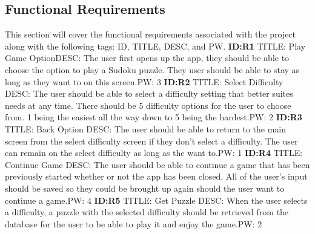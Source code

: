 \documentclass{article}
\begin{document}
\subsection{Functional Requirements}
This section will cover the functional requirements associated with the project along with the following tags: ID, TITLE, DESC, and PW. \newline \newline
\textbf{ID:R1} \newline TITLE: Play Game Option\newline DESC: The user first opens up the app, they should be able to choose the option to play a Sudoku puzzle. They user should be able to stay as long as they want to on this screen.\newline PW: 3 \newline \newline
\textbf{ID:R2} \newline TITLE: Select Difficulty \newline DESC: The user should be able to select a difficulty setting that better suites needs at any time. There should be 5 difficulty options for the user to choose from. 1 being the easiest all the way down to 5 being the hardest.\newline PW: 2 \newline \newline
\textbf{ID:R3} \newline TITLE: Back Option \newline DESC: The user should be able to return to the main screen from the select difficulty screen if they don't select a difficulty. The user can remain on the select difficulty as long as the want to.\newline PW: 1 \newline \newline
\textbf{ID:R4} \newline TITLE: Continue Game \newline DESC: The user should be able to continue a game that has been previously started whether or not the app has been closed. All of the user's input should be saved so they could be brought up again should the user want to continue a game.\newline PW: 4 \newline \newline
\textbf{ID:R5} \newline TITLE: Get Puzzle \newline DESC: When the user selects a difficulty, a puzzle with the selected difficulty should be retrieved from the database for the user to be able to play it and enjoy the game.\newline PW: 2 \newline \newline
\end{document}
